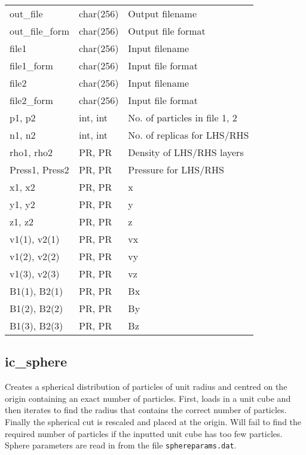 \documentclass[a4paper]{article}
\newcommand{\var}[1]{\texttt{#1}}
\begin{document}
\vspace{0.1cm}

\begin{center}
\begin{supertabular}{|p{3cm}|p{2cm}|p{8cm}|}
out\_file        & char(256) & Output filename \\
out\_file\_form  & char(256) & Output file format \\
file1            & char(256) & Input filename \\
file1\_form      & char(256) & Input file format \\
file2            & char(256) & Input filename \\
file2\_form      & char(256) & Input file format \\
p1, p2           & int, int  & No. of particles in file 1, 2 \\
n1, n2           & int, int  & No. of replicas for LHS/RHS \\
rho1, rho2       & PR, PR    & Density of LHS/RHS layers \\
Press1, Press2   & PR, PR    & Pressure for LHS/RHS \\
x1, x2           & PR, PR    & x \\
y1, y2           & PR, PR    & y \\
z1, z2           & PR, PR    & z \\
v1(1), v2(1)     & PR, PR    & vx \\
v1(2), v2(2)     & PR, PR    & vy \\
v1(3), v2(3)     & PR, PR    & vz \\
B1(1), B2(1)     & PR, PR    & Bx \\
B1(2), B2(2)     & PR, PR    & By \\
B1(3), B2(3)     & PR, PR    & Bz \\
\end{supertabular}
\end{center}

\newpage

\subsection{ic\_sphere}
Creates a spherical distribution of particles of unit radius and centred on the origin containing an exact number of particles.  First, loads in a unit cube and then iterates to find the radius that contains the correct number of particles.  Finally the spherical cut is rescaled and placed at the origin.  Will fail to find the required number of particles if the inputted unit cube has too few particles.  Sphere parameters are read in from the file \var{sphereparams.dat}. \newline
\end{document}
